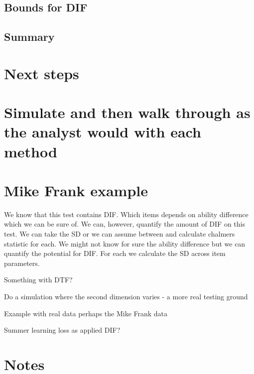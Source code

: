 \documentclass[
  11pt,
]{article}
\begin{document}
\hypertarget{bounds-for-dif}{%
\subsection{Bounds for DIF}\label{bounds-for-dif}}

\hypertarget{summary}{%
\subsection{Summary}\label{summary}}

\hypertarget{next-steps}{%
\section{Next steps}\label{next-steps}}

\hypertarget{simulate-and-then-walk-through-as-the-analyst-would-with-each-method}{%
\section{Simulate and then walk through as the analyst would with each method}\label{simulate-and-then-walk-through-as-the-analyst-would-with-each-method}}

\hypertarget{mike-frank-example}{%
\section{Mike Frank example}\label{mike-frank-example}}

We know that this test contains DIF. Which items depends on ability difference which we can be sure of. We can, however, quantify the amount of DIF on this test. We can take the SD or we can assume between and calculate chalmers statistic for each. We might not know for sure the ability difference but we can quantify the potential for DIF. For each we calculate the SD across item parameters.

Something with DTF?

Do a simulation where the second dimension varies - a more real testing ground

Example with real data perhaps the Mike Frank data

Summer learning loss as applied DIF?

\clearpage

\hypertarget{notes}{%
\section{Notes}\label{notes}}
\end{document}
